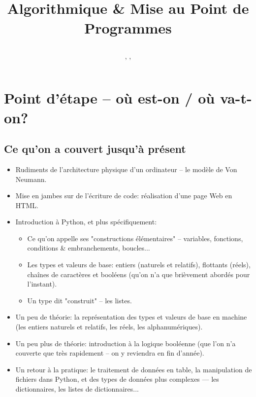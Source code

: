 \documentclass[12pt]{article}
\title
	{\vspace{3cm}
		{\Large
		\textit
			{
				\classe\hspace{0.1cm}
				\textemdash\
				\hspace{0.1cm}
				\themecours
			}
			
		\vspace{1cm}
		\huge{Algorithmique \& Mise au Point de Programmes} }
		 
		\vspace{1cm}
	}
\author{\etablissement}
\date{
	\auteur,
	\datedoc,
	\footnotesize{\textit{\versiondoc}} 
	\vspace{6cm}
	}
\begin{document}
	
	\maketitle
	\thispagestyle{empty}
		
	\section*{}
		{\noindent
		\resumecours
		}
		
	\pagebreak	
	\tableofcontents
	
	\pagebreak
	

	\section{Point d'étape -- où est-on / où va-t-on?}
	\subsection{Ce qu'on a couvert jusqu'à présent}
	
	\begin{itemize}
		\item Rudiments de l'architecture physique d'un ordinateur -- le modèle de Von Neumann.
		\item Mise en jambes sur de l'écriture de code: réalisation d'une page Web en HTML.
		\item Introduction à Python, et plus spécifiquement:
		\begin{itemize}
			\item Ce qu'on appelle ses "constructions élémentaires" -- variables, fonctions, conditions \& embranchements, boucles...
			\item Les types et valeurs de base: entiers (naturels et relatifs), flottants (réels), chaînes de caractères et booléens (qu'on n'a que brièvement abordés pour l'instant).
			\item Un type dit "construit" -- les listes.
		\end{itemize}
		\item Un peu de théorie: la représentation des types et valeurs de base en machine (les entiers naturels et relatifs, les réels, les alphanumériques).
		\item Un peu plus de théorie: introduction à la logique booléenne (que l'on n'a couverte que très rapidement -- on y reviendra en fin d'année).
		\item Un retour à la pratique: le traitement de données en table, la manipulation de fichiers dans Python, et des types de données plus complexes --- les dictionnaires, les listes de dictionnaires...
	\end{itemize}
	
\end{document}
